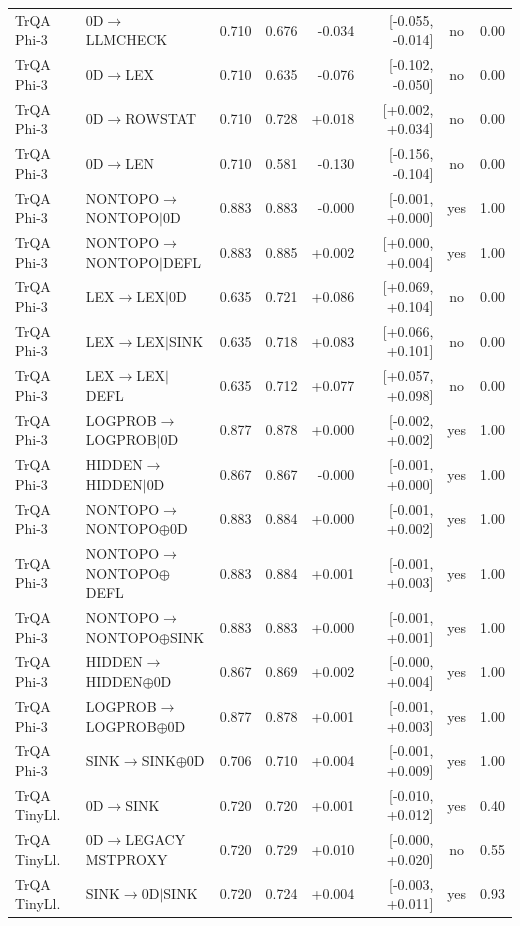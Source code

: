 \begin{longtable}{llrrrrcc}
TrQA Phi-3 & 0D$\to$LLMCHECK & 0.710 & 0.676 & -0.034 & [-0.055, -0.014] & no & 0.00 \\
TrQA Phi-3 & 0D$\to$LEX & 0.710 & 0.635 & -0.076 & [-0.102, -0.050] & no & 0.00 \\
TrQA Phi-3 & 0D$\to$ROWSTAT & 0.710 & 0.728 & +0.018 & [+0.002, +0.034] & no & 0.00 \\
TrQA Phi-3 & 0D$\to$LEN & 0.710 & 0.581 & -0.130 & [-0.156, -0.104] & no & 0.00 \\
TrQA Phi-3 & NONTOPO$\to$NONTOPO$\mid$0D & 0.883 & 0.883 & -0.000 & [-0.001, +0.000] & yes & 1.00 \\
TrQA Phi-3 & NONTOPO$\to$NONTOPO$\mid$DEFL & 0.883 & 0.885 & +0.002 & [+0.000, +0.004] & yes & 1.00 \\
TrQA Phi-3 & LEX$\to$LEX$\mid$0D & 0.635 & 0.721 & +0.086 & [+0.069, +0.104] & no & 0.00 \\
TrQA Phi-3 & LEX$\to$LEX$\mid$SINK & 0.635 & 0.718 & +0.083 & [+0.066, +0.101] & no & 0.00 \\
TrQA Phi-3 & LEX$\to$LEX$\mid$DEFL & 0.635 & 0.712 & +0.077 & [+0.057, +0.098] & no & 0.00 \\
TrQA Phi-3 & LOGPROB$\to$LOGPROB$\mid$0D & 0.877 & 0.878 & +0.000 & [-0.002, +0.002] & yes & 1.00 \\
TrQA Phi-3 & HIDDEN$\to$HIDDEN$\mid$0D & 0.867 & 0.867 & -0.000 & [-0.001, +0.000] & yes & 1.00 \\
TrQA Phi-3 & NONTOPO$\to$NONTOPO$\oplus$0D & 0.883 & 0.884 & +0.000 & [-0.001, +0.002] & yes & 1.00 \\
TrQA Phi-3 & NONTOPO$\to$NONTOPO$\oplus$DEFL & 0.883 & 0.884 & +0.001 & [-0.001, +0.003] & yes & 1.00 \\
TrQA Phi-3 & NONTOPO$\to$NONTOPO$\oplus$SINK & 0.883 & 0.883 & +0.000 & [-0.001, +0.001] & yes & 1.00 \\
TrQA Phi-3 & HIDDEN$\to$HIDDEN$\oplus$0D & 0.867 & 0.869 & +0.002 & [-0.000, +0.004] & yes & 1.00 \\
TrQA Phi-3 & LOGPROB$\to$LOGPROB$\oplus$0D & 0.877 & 0.878 & +0.001 & [-0.001, +0.003] & yes & 1.00 \\
TrQA Phi-3 & SINK$\to$SINK$\oplus$0D & 0.706 & 0.710 & +0.004 & [-0.001, +0.009] & yes & 1.00 \\
TrQA TinyLl. & 0D$\to$SINK & 0.720 & 0.720 & +0.001 & [-0.010, +0.012] & yes & 0.40 \\
TrQA TinyLl. & 0D$\to$LEGACY MSTPROXY & 0.720 & 0.729 & +0.010 & [-0.000, +0.020] & no & 0.55 \\
TrQA TinyLl. & SINK$\to$0D$\mid$SINK & 0.720 & 0.724 & +0.004 & [-0.003, +0.011] & yes & 0.93 \\

\end{longtable}
